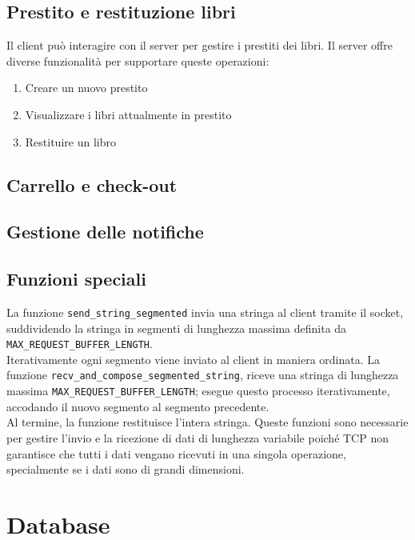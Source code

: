 \documentclass[]{report}
\begin{document}
\section{Prestito e restituzione libri}
Il client può interagire con il server per gestire i prestiti dei libri. Il server offre diverse funzionalità per supportare queste operazioni:
\begin{enumerate}
	\item Creare un nuovo prestito
	\item Visualizzare i libri attualmente in prestito
	\item Restituire un libro
\end{enumerate}
\section{Carrello e check-out}

\section{Gestione delle notifiche}

\section{Funzioni speciali}
La funzione \texttt{send\_string\_segmented} invia una stringa al client tramite il socket, suddividendo la stringa in segmenti di lunghezza massima definita da \texttt{MAX\_REQUEST\_BUFFER\_LENGTH}.\\
Iterativamente ogni segmento viene inviato al client in maniera ordinata. \meskip
La funzione \texttt{recv\_and\_compose\_segmented\_string}, riceve una stringa di lunghezza \\ massima \texttt{MAX\_REQUEST\_BUFFER\_LENGTH}; esegue questo processo iterativamente, accodando il nuovo segmento al segmento precedente.\\
Al termine, la funzione restituisce l'intera stringa.\bskip
Queste funzioni sono necessarie per gestire l'invio e la ricezione di dati di lunghezza variabile poiché TCP non garantisce che tutti i dati vengano ricevuti in una singola operazione, specialmente se i dati sono di grandi dimensioni.


\chapter{Database}
\end{document}
